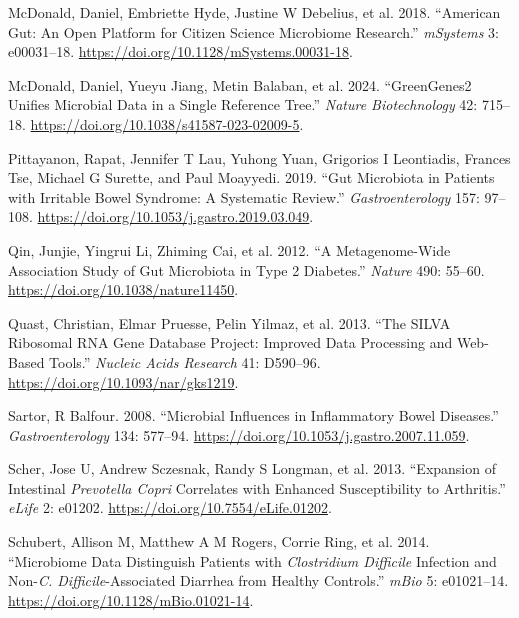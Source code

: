\documentclass[
  11pt,
]{article}
\newlength{\cslhangindent}
\newenvironment{CSLReferences}[2] %
 {\begin{list}{}{%
  \setlength{\itemindent}{0pt}
  \setlength{\leftmargin}{0pt}
  \setlength{\parsep}{0pt}
  \ifodd #1
   \setlength{\leftmargin}{\cslhangindent}
   \setlength{\itemindent}{-1\cslhangindent}
  \fi
  \setlength{\itemsep}{#2\baselineskip}}}
 {\end{list}}
\begin{document}
\begin{CSLReferences}{1}{0}
McDonald, Daniel, Embriette Hyde, Justine W Debelius, et al. 2018.
{``{A}merican {G}ut: An Open Platform for Citizen Science Microbiome
Research.''} \emph{mSystems} 3: e00031--18.
\url{https://doi.org/10.1128/mSystems.00031-18}.

McDonald, Daniel, Yueyu Jiang, Metin Balaban, et al. 2024.
{``{G}reen{G}enes2 Unifies Microbial Data in a Single Reference Tree.''}
\emph{Nature Biotechnology} 42: 715--18.
\url{https://doi.org/10.1038/s41587-023-02009-5}.

Pittayanon, Rapat, Jennifer T Lau, Yuhong Yuan, Grigorios I Leontiadis,
Frances Tse, Michael G Surette, and Paul Moayyedi. 2019. {``Gut
Microbiota in Patients with Irritable Bowel Syndrome: A Systematic
Review.''} \emph{Gastroenterology} 157: 97--108.
\url{https://doi.org/10.1053/j.gastro.2019.03.049}.

Qin, Junjie, Yingrui Li, Zhiming Cai, et al. 2012. {``A Metagenome-Wide
Association Study of Gut Microbiota in Type 2 Diabetes.''} \emph{Nature}
490: 55--60. \url{https://doi.org/10.1038/nature11450}.

Quast, Christian, Elmar Pruesse, Pelin Yilmaz, et al. 2013. {``The
{SILVA} Ribosomal {RNA} Gene Database Project: Improved Data Processing
and Web-Based Tools.''} \emph{Nucleic Acids Research} 41: D590--96.
\url{https://doi.org/10.1093/nar/gks1219}.

Sartor, R Balfour. 2008. {``Microbial Influences in Inflammatory Bowel
Diseases.''} \emph{Gastroenterology} 134: 577--94.
\url{https://doi.org/10.1053/j.gastro.2007.11.059}.

Scher, Jose U, Andrew Sczesnak, Randy S Longman, et al. 2013.
{``Expansion of Intestinal \emph{{P}revotella Copri} Correlates with
Enhanced Susceptibility to Arthritis.''} \emph{eLife} 2: e01202.
\url{https://doi.org/10.7554/eLife.01202}.

Schubert, Allison M, Matthew A M Rogers, Corrie Ring, et al. 2014.
{``Microbiome Data Distinguish Patients with \emph{{C}lostridium
Difficile} Infection and Non-\emph{{C}. Difficile}-Associated Diarrhea
from Healthy Controls.''} \emph{mBio} 5: e01021--14.
\url{https://doi.org/10.1128/mBio.01021-14}.


\end{CSLReferences}
\end{document}
